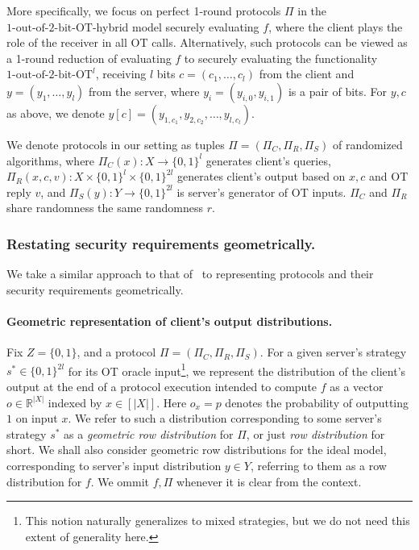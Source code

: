 \documentclass[a4paper]{article}
\newcommand{\OT}[2]{#1\text{-out-of-}#2\text{-bit-OT}}
\newcommand{\R}{\mathbb{R}}
\begin{document}
More specifically, we focus 
on perfect 1-round protocols $\Pi$ in the $\OT{1}{2}$-hybrid model
securely evaluating $f$, where the client plays the role of the receiver in all OT calls. 
Alternatively, such protocols can be viewed as a 1-round reduction of evaluating $f$ to securely evaluating the functionality ${\OT{1}{2}}^l$, receiving $l$ bits $c=(c_1,\ldots,c_l)$ from the client and $y=(y_1,\ldots,y_l)$ from the server, 
where $y_i=(y_{i,0},y_{i,1})$ is a pair of bits.
For $y,c$ as above, we denote $y[c]=(y_{1,c_1},y_{2,c_2},\ldots,y_{l,c_l})$.

We denote protocols in our setting as tuples $\Pi=(\Pi_C,\Pi_R,\Pi_S)$ of randomized algorithms, where $\Pi_C(x):X\rightarrow \{0,1\}^l$ generates client's queries, $\Pi_R(x,c,v):X\times\{0,1\}^l\times  \{0,1\}^{2l}$ generates client's output based on $x,c$ and OT reply $v$, and $\Pi_S(y):Y\rightarrow \{0,1\}^{2l}$ is server's generator of OT inputs. $\Pi_C$ and $\Pi_R$ share randomness the same randomness $r$.

\subsubsection{Restating security requirements geometrically.}
We take a similar approach to that of~\cite{Ash14}
to representing protocols and their security requirements geometrically.

\paragraph{Geometric representation of client's output distributions.}
Fix $Z=\{0,1\}$, and a protocol $\Pi=(\Pi_C,\Pi_R,\Pi_S)$. For a given server's strategy $s^*\in\{0,1\}^{2l}$ for its OT oracle input\;\footnote{This notion naturally generalizes to mixed strategies, but we do not need this extent of generality here.}, we represent the distribution of the client's output at the end of a protocol execution intended to compute $f$ as a vector $o\in \R^{|X|}$ indexed by $x\in [|X|]$. Here $o_x=p$ denotes the probability of outputting $1$ on input $x$. We refer to such a distribution corresponding to some server's strategy $s^*$ as a \emph{geometric row distribution} for $\Pi$, or just \emph{row distribution} for short. 
We shall also consider geometric row distributions for the ideal model, corresponding to server's input distribution $y\in Y$, referring to them as a row distribution for $f$. We ommit $f,\Pi$ whenever it is clear from the context.
\end{document}
